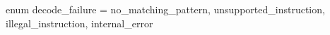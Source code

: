 enum decode_failure = {
  no_matching_pattern,
  unsupported_instruction,
  illegal_instruction,
  internal_error
}
